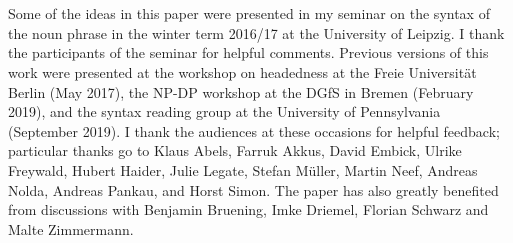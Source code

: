 \documentclass[output=paper,colorlinks,citecolor=black,
]{langscibook}
\begin{document}
\section*{\acknowledgmentsUS}


Some of the ideas in this paper were presented in my seminar on the syntax of the noun phrase in the winter term 2016/17 at the University of Leipzig. I thank the participants of the seminar for helpful comments. Previous versions of this work were presented at the workshop on headedness at the Freie Universität Berlin (May 2017), the NP-DP workshop at the DGfS in Bremen (February 2019), and the syntax reading group at the University of Pennsylvania (September 2019). I thank the audiences at these occasions for helpful feedback; particular thanks go to Klaus Abels, Farruk Akkus, David Embick, Ulrike Freywald, Hubert Haider, Julie Legate, Stefan Müller, Martin Neef, Andreas Nolda, Andreas Pankau, and Horst Simon. The paper has also greatly benefited from discussions with Benjamin Bruening, Imke Driemel, Florian Schwarz and Malte Zimmermann.

\printbibliography[heading=subbibliography,notkeyword=this]
\end{document}
